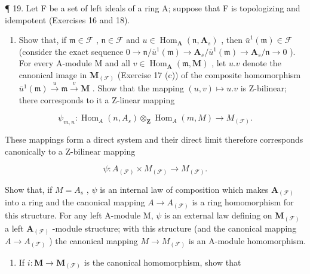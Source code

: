 ¶ 19. Let F be a set of left ideals of a ring A; suppose that F is topologizing and idempotent (Exercises 16 and 18).

\begin{enumerate}
\def\labelenumi{(\alph{enumi})}
\tightlist
\item
  Show that, if \(\mathfrak{m} \in \mathcal{F}\) , \(\mathfrak{n} \in \mathcal{F}\) and \(u \in \operatorname{Hom}_{\mathbf{A}}(\mathfrak{n}, \mathbf{A}_s)\) , then \(\bar{u}^1(\mathfrak{m}) \in \mathcal{F}\) (consider the exact sequence \(0 \to \mathfrak{n} / \bar{u}^1(\mathfrak{m}) \to \mathbf{A}_s / \bar{u}^1(\mathfrak{m}) \to \mathbf{A}_s / \mathfrak{n} \to 0\) ). For every A-module M and all \(v \in \operatorname{Hom}_{\mathbf{A}}(\mathfrak{m}, \mathbf{M})\) , let \(u.v\) denote the canonical image in \(\mathbf{M}_{(\mathcal{F})}\) (Exercise 17 (c)) of the composite homomorphism \(\bar{u}^1(\mathfrak{m}) \xrightarrow{u} \mathfrak{m} \xrightarrow{v} \mathbf{M}\) . Show that the mapping \((u,v) \mapsto u.v\) is Z-bilinear; there corresponds to it a Z-linear mapping
\end{enumerate}

\[
\psi_ {m, n} \colon \operatorname{Hom} _ {A} (n, A _ {s}) \otimes_ {\mathbf {Z}} \operatorname{Hom} _ {A} (m, M) \rightarrow M _ {(\mathcal {F})}.
\]

These mappings form a direct system and their direct limit therefore corresponds canonically to a Z-bilinear mapping

\[
\psi \colon A _ {(\mathcal {F})} \times M _ {(\mathcal {F})} \rightarrow M _ {(\mathcal {F})}.
\]

Show that, if \(M = A_{s}\) , \(\psi\) is an internal law of composition which makes \(\mathbf{A}_{(\mathcal{F})}\) into a ring and the canonical mapping \(A \to A_{(\mathcal{F})}\) is a ring homomorphism for this structure. For any left A-module M, \(\psi\) is an external law defining on \(\mathbf{M}_{(\mathcal{F})}\) a left \(\mathbf{A}_{(\mathcal{F})}\) -module structure; with this structure (and the canonical mapping \(A \to A_{(\mathcal{F})}\) ) the canonical mapping \(M \to M_{(\mathcal{F})}\) is an A-module homomorphism.

\begin{enumerate}
\def\labelenumi{(\alph{enumi})}
\setcounter{enumi}{1}
\tightlist
\item
  If \(i: \mathbf{M} \to \mathbf{M}_{(\mathcal{F})}\) is the canonical homomorphism, show that
\end{enumerate}


